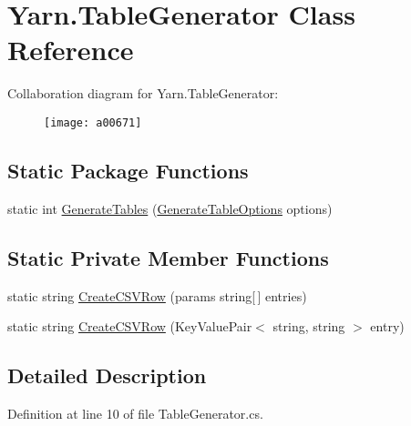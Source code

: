 \hypertarget{a00151}{\section{Yarn.\-Table\-Generator Class Reference}
\label{a00151}
}


Collaboration diagram for Yarn.\-Table\-Generator\-:
\nopagebreak
\begin{figure}[H]
\begin{center}
\leavevmode
\texttt{[image: a00671]}
\end{center}
\end{figure}
\subsection*{Static Package Functions}
\begin{DoxyCompactItemize}
\item 
static int \hyperlink{a00151_a1d65ef643c3f3495cf9480f86172ff87}{Generate\-Tables} (\hyperlink{a00102}{Generate\-Table\-Options} options)
\end{DoxyCompactItemize}
\subsection*{Static Private Member Functions}
\begin{DoxyCompactItemize}
\item 
static string \hyperlink{a00151_ac03637d16d3512258c997b9a21af6c42}{Create\-C\-S\-V\-Row} (params string\mbox{[}$\,$\mbox{]} entries)
\item 
static string \hyperlink{a00151_aa16da6b6810ce3a5fd2a7920de6322ef}{Create\-C\-S\-V\-Row} (Key\-Value\-Pair$<$ string, string $>$ entry)
\end{DoxyCompactItemize}


\subsection{Detailed Description}


Definition at line 10 of file Table\-Generator.\-cs.



